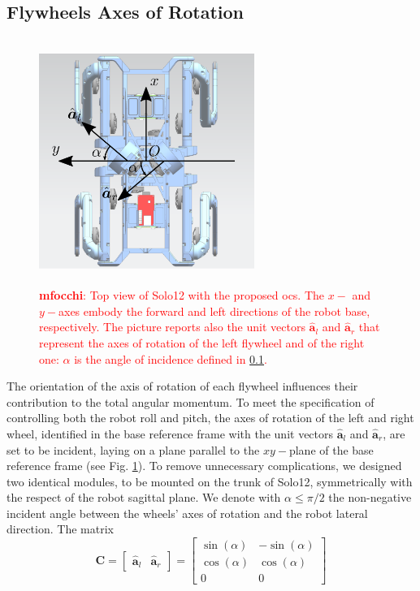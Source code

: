 \documentclass[sensors,article,submit,pdftex,moreauthors]{Definitions/mdpi}
\newcommand{\MF}[1]{\textcolor{red}{\textbf{mfocchi}: #1}}
\begin{document}
\subsection{Flywheels Axes of Rotation}
\label{subseq:flywheel_axes}
\begin{figure}[t]
	\centering
	\includegraphics[width=7cm,height=8cm,keepaspectratio]{figures/axes.eps}
	\caption{\small \MF{Top view of Solo12 with the proposed \gls{ocs}. The $x-$ and $y-$axes embody the forward and left directions of the robot base, respectively. The picture reports also the unit vectors $\hat{\bm{a}}_l$ and $\hat{\bm{a}}_r$  that represent the axes of rotation of the left flywheel and of the right one: $\alpha$ is the angle of incidence defined in \ref{subseq:flywheel_axes}.}}
	\label{fig:axes}
\end{figure}
The orientation of the axis of rotation of each flywheel influences their contribution to the total angular momentum. To meet the specification of controlling both the robot roll and pitch, the axes of rotation of the left and right wheel, identified in the base reference frame with the unit vectors $\hat{\bm{a}}_l$ and $\hat{\bm{a}}_r$, are set to be incident, laying on a plane parallel to the $xy-$plane of the base reference frame (see Fig. \ref{fig:axes}). 
To remove unnecessary complications, we designed two identical modules, to be mounted on the trunk of Solo12, symmetrically with the respect of the robot sagittal plane. We denote with $\alpha \leq \pi/2$ the non-negative incident angle between the wheels' axes of rotation and the robot lateral direction. The matrix 
\begin{equation}
\bm{C} = 
\left[ \begin{array}{cc}
\hat{\bm{a}}_l & \hat{\bm{a}}_r
\end{array} \right] = 
\left[ \begin{array}{cc}
\sin(\alpha) & -\sin(\alpha) \\
\cos(\alpha) & \cos(\alpha) \\
0 & 0
\end{array} \right]
\end{equation}
\end{document}
